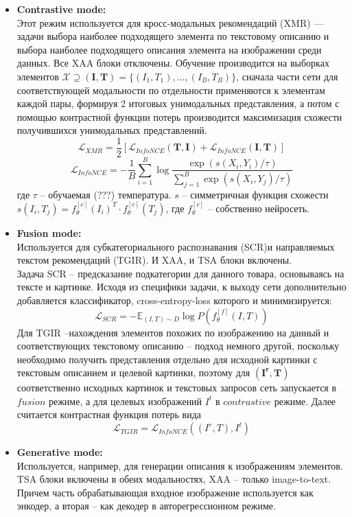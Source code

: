 \documentclass[a4paper,12pt]{article}
\begin{document}
				\begin{itemize}
					\item[]\textbf{Contrastive mode:}\\
					Этот режим используется для кросс-модальных рекомендаций (XMR) --- задачи выбора наиболее подходящего элемента по текстовому описанию и выбора наиболее подходящего описания элемента на изображении среди данных. Все XAA блоки отключены. Обучение производится на выборках элементов $\mathcal{X} \supseteq (\textbf{I}, \textbf{T}) = \{(I_1, T_1), \dots, (I_B, T_B)\}$, сначала части сети для соответствующей модальности по отдельности применяются к элементам каждой пары, формируя 2 итоговых унимодальных представления, а потом с помощью контрастной функции потерь \cite{https://doi.org/10.48550/arXiv.2004.11362} производится максимизация схожести получившихся унимодальных представлений.
					$$\mathcal{L}_{XMR} = \frac{1}{2} [\mathcal{L}_{InfoNCE}(\mathbf{T}, \mathbf{I}) + \mathcal{L}_{InfoNCE}(\mathbf{I}, \mathbf{T})]$$
					$$\mathcal{L}_{InfoNCE} = -\frac{1}{B}\sum\limits_{i=1}^{B}\log\frac{\exp(s(X_i, Y_i)/\tau)}{\sum_{j=1}^B\exp(s(X_i, Y_j)/\tau)}$$
					где $\tau$ -- обучаемая (???) температура. $s$ -- симметричная функция схожести $s(I_i, T_j) = f_\theta^{[c]}(I_i)^T\cdot f_\theta^{[c]}(T_j)$, где $f_\theta^{[c]}$ -- собственно нейросеть.
					\item[]\textbf{Fusion mode:}\\
					Используется для субкатегориального распознавания (SCR)и направляемых текстом рекомендаций (TGIR). И XAA, и TSA блоки включены. \\
					Задача SCR -- предсказание подкатегории для данного товара, основываясь на тексте и картинке. Исходя из специфики задачи, к выходу сети дополнительно добавляется классификатор, cross-entropy-loss которого и минимизируется:
					$$\mathcal{L}_{SCR} = -\mathbb{E}_{(I,T)\sim D}\log P\left(f_\theta^{[f]}(I, T)\right)$$
					Для TGIR --нахождения элементов похожих по изображению на данный и соответствующих текстовому описанию -- подход немного другой, поскольку необходимо получить представления отдельно для исходной картинки с текстовым описанием и целевой картинки, поэтому для $(\mathbf{I^r}, \mathbf{T})$ соответственно исходных картинок и текстовых запросов сеть запускается в $fusion$ режиме, а для целевых изображений $I^t$ в $contrastive$ режиме. Далее считается контрастная функция потерь вида
					$$\mathcal{L}_{TGIR} = \mathcal{L}_{InfoNCE}((I^r,T), I^t)$$
					
					\item[]\textbf{Generative mode:}\\
					Используется, например, для генерации описания к изображениям элементов. TSA блоки включены в обеих модальностях, XAA -- только image-to-text. Причем часть обрабатывающая входное изображение используется как энкодер, а вторая -- как декодер в авторегрессионном режиме.
				\end{itemize}
				
\end{document}
